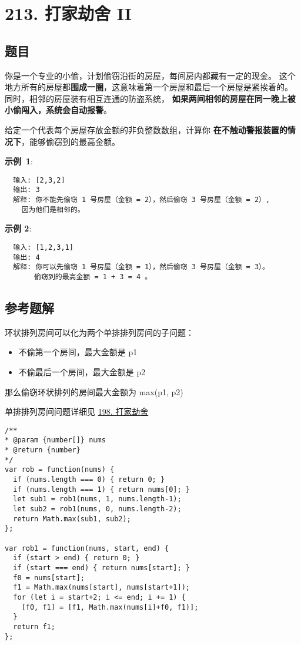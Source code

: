 \newpage
\section{213. 打家劫舍 II}
\label{leetcode:213}

\subsection{题目}

你是一个专业的小偷，计划偷窃沿街的房屋，每间房内都藏有一定的现金。
这个地方所有的房屋都\textbf{围成一圈}，这意味着第一个房屋和最后一个房屋是紧挨着的。
同时，相邻的房屋装有相互连通的防盗系统，
\textbf{如果两间相邻的房屋在同一晚上被小偷闯入，系统会自动报警}。

给定一个代表每个房屋存放金额的非负整数数组，计算你
\textbf{在不触动警报装置的情况下}，能够偷窃到的最高金额。

\textbf{示例 1}:

\begin{verbatim}
  输入: [2,3,2]
  输出: 3
  解释: 你不能先偷窃 1 号房屋（金额 = 2），然后偷窃 3 号房屋（金额 = 2）,
    因为他们是相邻的。
\end{verbatim}

\textbf{示例 2}:

\begin{verbatim}
  输入: [1,2,3,1]
  输出: 4
  解释: 你可以先偷窃 1 号房屋（金额 = 1），然后偷窃 3 号房屋（金额 = 3）。
       偷窃到的最高金额 = 1 + 3 = 4 。
\end{verbatim}

\subsection{参考题解}

环状排列房间可以化为两个单排排列房间的子问题：

\begin{itemize}
  \item 不偷第一个房间，最大金额是 p1
  \item 不偷最后一个房间，最大金额是 p2
\end{itemize}

那么偷窃环状排列的房间最大金额为 max(p1, p2)

单排排列房间问题详细见 \hyperref[leetcode:198]{198. 打家劫舍}

\begin{verbatim}
/**
* @param {number[]} nums
* @return {number}
*/
var rob = function(nums) {
  if (nums.length === 0) { return 0; }
  if (nums.length === 1) { return nums[0]; }
  let sub1 = rob1(nums, 1, nums.length-1);
  let sub2 = rob1(nums, 0, nums.length-2);
  return Math.max(sub1, sub2);
};

var rob1 = function(nums, start, end) {
  if (start > end) { return 0; }
  if (start === end) { return nums[start]; }
  f0 = nums[start];
  f1 = Math.max(nums[start], nums[start+1]);
  for (let i = start+2; i <= end; i += 1) {
    [f0, f1] = [f1, Math.max(nums[i]+f0, f1)];
  }
  return f1;
};
\end{verbatim}
